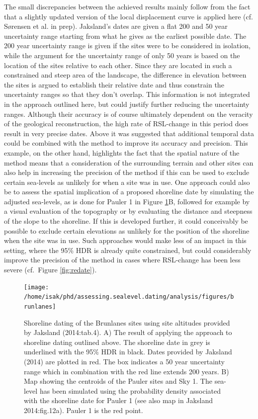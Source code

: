 \documentclass[
]{article}
\begin{document}
The small discrepancies between the achieved results mainly follow from the fact that a slightly updated version of the local displacement curve is applied here (cf. Sørensen et al. in prep). Jaksland's dates are given a flat 200 and 50 year uncertainty range starting from what he gives as the earliest possible date. The 200 year uncertainty range is given if the sites were to be considered in isolation, while the argument for the uncertainty range of only 50 years is based on the location of the sites relative to each other. Since they are located in such a constrained and steep area of the landscape, the difference in elevation between the sites is argued to establish their relative date and thus constrain the uncertainty ranges so that they don't overlap. This information is not integrated in the approach outlined here, but could justify further reducing the uncertainty ranges. Although their accuracy is of course ultimately dependent on the veracity of the geological reconstruction, the high rate of RSL-change in this period does result in very precise dates. Above it was suggested that additional temporal data could be combined with the method to improve its accuracy and precision. This example, on the other hand, highlights the fact that the spatial nature of the method means that a consideration of the surrounding terrain and other sites can also help in increasing the precision of the method if this can be used to exclude certain sea-levels as unlikely for when a site was in use. One approach could also be to assess the spatial implication of a proposed shoreline date by simulating the adjusted sea-levels, as is done for Pauler 1 in Figure \ref{fig:brunlanes}B, followed for example by a visual evaluation of the topography or by evaluating the distance and steepness of the slope to the shoreline. If this is developed further, it could conceivably be possible to exclude certain elevations as unlikely for the position of the shoreline when the site was in use. Such approaches would make less of an impact in this setting, where the 95\% HDR is already quite constrained, but could considerably improve the precision of the method in cases where RSL-change has been less severe (cf.~Figure \ref{fig:redate}).

\begin{figure}

{\centering \texttt{[image: /home/isak/phd/assessing.sealevel.dating/analysis/figures/brunlanes]} 

}

\caption{Shoreline dating of the Brunlanes sites using site altitudes provided by Jaksland (2014:tab.4). A) The result of applying the approach to shoreline dating outlined above. The shoreline date in grey is underlined with the 95\% HDR in black. Dates provided by Jaksland (2014) are plotted in red. The box indicates a 50 year uncertainty range which in combination with the red line extends 200 years. B) Map showing the centroids of the Pauler sites and Sky 1. The sea-level has been simulated using the probability density associated with the shoreline date for Pauler 1 (see also map in Jaksland 2014:fig.12a). Pauler 1 is the red point.}\label{fig:brunlanes}
\end{figure}
\end{document}
